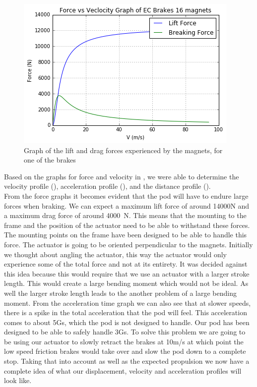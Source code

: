 \documentclass[main.tex]{subfiles}
\begin{document}
    \begin{figure}[H]
        \centering
        \includegraphics[width=\linewidth]{images/force_velocity_graph_16_magnets.png}
        \caption{Graph of the lift and drag forces experienced by the magnets, for one of the brakes}
        \label{fig:force-velocity-graph}
    \end{figure}
    Based on the graphs for force and velocity in , we were able to determine the velocity profile (), acceleration profile (), and the distance profile ().\\
    From the force graphs it becomes evident that the pod will have to endure large forces when braking. We can expect a maximum lift force of around 14000N and a maximum drag force of around \SI{4000}{N}. This means that the mounting to the frame and the position of the actuator need to be able to withstand these forces. The mounting points on the frame have been designed to be able to handle this force. The actuator is going to be oriented perpendicular to the magnets. Initially we thought about angling the actuator, this way the actuator would only experience some of the total force and not at its entirety. It was decided against this idea because this would require that we use an actuator with a larger stroke length. This would create a large bending moment which would not be ideal. As well the larger stroke length leads to the another problem of a large bending moment.
    From the acceleration time graph we can also see that at slower speeds, there is a spike in the total acceleration that the pod will feel. This acceleration comes to about 5Gs, which the pod is not designed to handle. Our pod has been designed to be able to safely handle 3Gs. To solve this problem we are going to be using our actuator to slowly retract the brakes at 10m/s at which point the low speed friction brakes would take over and slow the pod down to a complete stop. 
   Taking that into account as well as the expected propulsion we now have a complete idea of what our displacement, velocity and acceleration profiles will look like.
   
\end{document}
